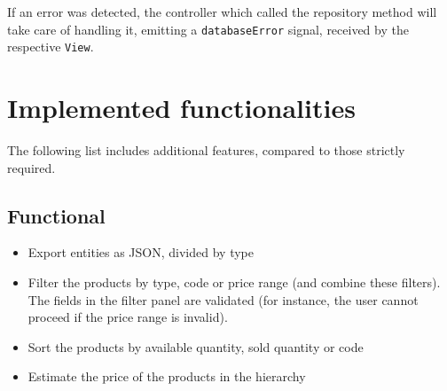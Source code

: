 \documentclass[10pt]{article}
\begin{document}
If an error was detected, the controller which called the repository method
will take care of handling it, emitting a \texttt{databaseError} signal,
received by the respective \texttt{View}.

\section{Implemented functionalities}
The following list includes additional features, compared to those strictly
required.
\subsection{Functional}
\begin{itemize}
    \item Export entities as JSON, divided by type
    \item Filter the products by type, code or price range (and combine these filters).
          The fields in the filter panel are validated (for instance, the user cannot proceed
          if the price range is invalid). 
    \item Sort the products by available quantity, sold quantity or code
    \item Estimate the price of the products in the hierarchy
\end{itemize}
\end{document}
